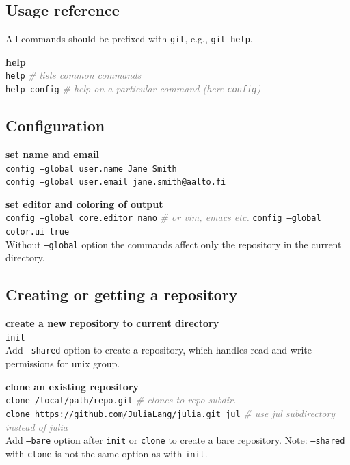 \documentclass[landscape]{article}
\newcommand*{\prog}{\texttt}
\newcommand*{\proge}[1]{\textcolor{gray}{\textit{\# #1}}}
\begin{document}
\pagebreak
\begin{multicols*}{3}
  \section{Usage reference}

  All commands should be prefixed with \prog{git}, e.g., \prog{git help}.
  \begin{myitemize}
    \item \textbf{help}\\
      \prog{help} \proge{lists common commands}\\
      \prog{help config} \proge{help on a particular command (here \prog{config})}
  \end{myitemize}

  \subsection{Configuration}
  \begin{myitemize}
    \item \textbf{set name and email}\\
      \prog{config --global user.name Jane Smith}\\
      \prog{config --global user.email jane.smith@aalto.fi}
    \item \textbf{set editor and coloring of output}\\
      \prog{config --global core.editor nano} \proge{or vim, emacs etc.}
      \prog{config --global color.ui true}
      \vspace{\parsep}\\
      Without \prog{--global} option the commands affect only the repository in the current directory.
  \end{myitemize}

  \subsection{Creating or getting a repository}
  \begin{myitemize}
    \item \textbf{create a new repository to current directory}\\
      \prog{init}
      \vspace{\parsep}\\
      Add \prog{--shared} option to create a repository, which handles read and write permissions for unix group.
    \item \textbf{clone an existing repository}\\
      \prog{clone /local/path/repo.git} \proge{clones to repo subdir.}\\
      \prog{clone https://github.com/JuliaLang/julia.git jul} \proge{use jul subdirectory instead of julia}
      \vspace{\parsep}\\
      Add \prog{--bare} option after \prog{init} or \prog{clone} to create a bare repository. Note: \prog{--shared} with \prog{clone} is not the same option as with \prog{init}. 
  \end{myitemize}


\end{multicols*}
\end{document}
